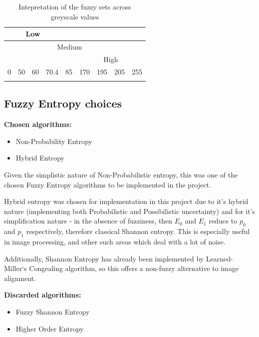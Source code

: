 \begin{table}
  \center
  \begin{tabular}{ |l|l|l|l|l|l|l|l|l| }
    \hline
    \multicolumn{4}{|c|}{Low} & \multicolumn{5}{|c|}{} \\
    \hline
    \multicolumn{2}{|c|}{} & \multicolumn{5}{|c|}{Medium} & \multicolumn{2}{|c|}{}  \\
    \hline
    \multicolumn{5}{|c|}{} & \multicolumn{4}{|c|}{High} \\
    \hline
    0 & 50 & 60 & 70.4 & 85 & 170 & 195 & 205 & 255 \\
    \hline
    \cellcolor[gray]{0} & \cellcolor[gray]{0.19} & \cellcolor[gray]{0.24} & \cellcolor[gray]{0.28} & \cellcolor[gray]{0.33} & \cellcolor[gray]{0.66} & \cellcolor[gray]{0.76} & \cellcolor[gray]{0.8} & \cellcolor[gray]{1} \\ \hline
  \end{tabular}
\caption{Intepretation of the fuzzy sets across greyscale values}
\end{table}

\subsection{Fuzzy Entropy choices}

\textbf{Chosen algorithms:}
\begin{itemize}
  \item Non-Probability Entropy
  \item Hybrid Entropy
\end{itemize}

Given the simplistic nature of Non-Probabilistic entropy, this was one of the chosen Fuzzy Entropy algorithms to be implemented in the project.

Hybrid entropy was chosen for implementation in this project due to it's hybrid nature (implementing both Probabilistic and Possibilistic uncertainty) and for it's simplification nature - in the absence of fuzziness, then $E_0$ and $E_1$ reduce to $p_0$ and $p_1$ respectively, therefore classical Shannon entropy. This is especially useful in image processing, and other such areas which deal with a lot of noise.

Additionally, Shannon Entropy has already been implemented by Learned-Miller`s Congealing algorithm, so this offers a non-fuzzy alternative to image alignment.

\textbf{Discarded algorithms:}
\begin{itemize}
  \item Fuzzy Shannon Entropy
  \item Higher Order Entropy
\end{itemize}

